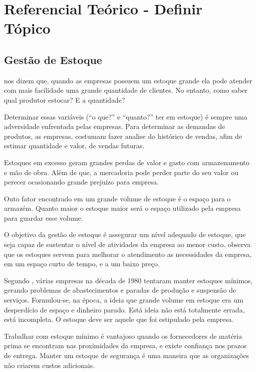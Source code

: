 \section{Referencial Teórico - Definir Tópico}
\label{chapter:secao2}

\subsection{Gestão de Estoque}
\label{subsection:gestaoEstoque}

 nos dizem que, quando as empresas possuem um estoque grande ela pode atender com mais facilidade uma grande quantidade de clientes. No entanto, como saber qual produtor estocar? E a quantidade? 

Determinar essas variáveis (“o que?” e “quanto?” ter em estoque) é sempre uma adversidade enfrentada pelas empresas. Para determinar as demandas de produtos, as empresas, costumam fazer analise do histórico de vendas, afim de estimar quantidade e valor, de vendas futuras. 

Estoques em excesso geram grandes perdas de valor e gasto com armazenamento e mão de obra. Além de que, a mercadoria pode perder parte do seu valor ou perecer ocasionando grande prejuízo para empresa.

Outo fator encontrado em um grande volume de estoque é o espaço para o armazém. Quanto maior o estoque maior será o espaço utilizado pela empresa para guardar esse volume.

O objetivo da gestão de estoque é assegurar um nível adequado de estoque, que seja capaz de sustentar o nível de atividades da empresa ao menor custo. 
 observa que os estoques servem para melhorar o atendimento as necessidades da empresa, em um espaço curto de tempo, e a um baixo preço. 

Segundo , várias empresas na década de 1980 tentaram manter estoques mínimos, gerando problemas de abastecimentos e paradas de produção e suspensão de serviços. Formulou-se, na época, a ideia que grande volume em estoque era um desperdício de espaço e dinheiro parado. Está ideia não está totalmente errada, está incompleta. O estoque deve ser aquele que foi estipulado pela empresa.

Trabalhar com estoque mínimo é vantajoso quando os fornecedores de matéria prima se encontram nas proximidades da empresa, e existe confiança nos prazos de entrega. Manter um estoque de segurança é uma maneira que as organizações não criarem custos adicionais. 

